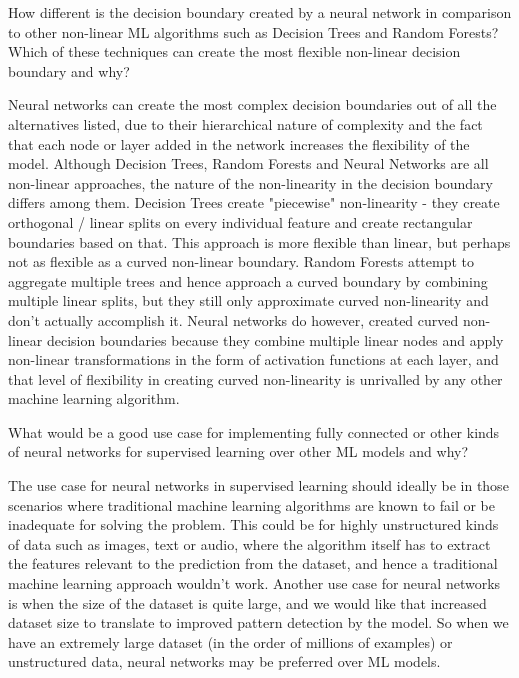 	\begin{qanda}
		\begin{question}
How different is the decision boundary created by a neural network in comparison to other non-linear ML algorithms such as Decision Trees and Random Forests? Which of these techniques can create the most flexible non-linear decision boundary and why?
		\end{question}
		\begin{answer}
Neural networks can create the most complex decision boundaries out of all the alternatives listed, due to their hierarchical nature of complexity and the fact that each node or layer added in the network increases the flexibility of the model. Although Decision Trees, Random Forests and Neural Networks are all non-linear approaches, the nature of the non-linearity in the decision boundary differs among them. Decision Trees create "piecewise" non-linearity - they create orthogonal / linear splits on every individual feature and create rectangular boundaries based on that. This approach is more flexible than linear, but perhaps not as flexible as a curved non-linear boundary. Random Forests attempt to aggregate multiple trees and hence approach a curved boundary by combining multiple linear splits, but they still only approximate curved non-linearity and don't actually accomplish it. Neural networks do however, created curved non-linear decision boundaries because they combine multiple linear nodes and apply non-linear transformations in the form of activation functions at each layer, and that level of flexibility in creating curved non-linearity is unrivalled by any other machine learning algorithm.
		\end{answer}
	\end{qanda}

	\begin{qanda}
		\begin{question}
What would be a good use case for implementing fully connected or other kinds of neural networks for supervised learning over other ML models and why?
		\end{question}
		\begin{answer}
The use case for neural networks in supervised learning should ideally be in those scenarios where traditional machine learning algorithms are known to fail or be inadequate for solving the problem. This could be for highly unstructured kinds of data such as images, text or audio, where the algorithm itself has to extract the features relevant to the prediction from the dataset, and hence a traditional machine learning approach wouldn't work. Another use case for neural networks is when the size of the dataset is quite large, and we would like that increased dataset size to translate to improved pattern detection by the model. So when we have an extremely large dataset (in the order of millions of examples) or unstructured data, neural networks may be preferred over ML models.
		\end{answer}
	\end{qanda}

